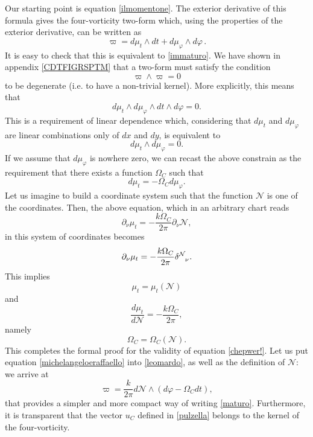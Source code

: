 \documentclass[usenatbib%
]{mnras}
\begin{document}
Our starting point is equation  \eqref{ilmomentone}. The exterior derivative of this formula gives the four-vorticity two-form which, using the properties of the exterior derivative, can be written as
\begin{equation}\label{leomardo}
\varpi = d\mu_t \wedge dt + d\mu_\varphi \wedge d\varphi \, .
\end{equation}
It is easy to check that this is equivalent to \eqref{immaturo}. We have shown in appendix \ref{CDTFIGRSPTM} that a two-form  must satisfy the condition
\begin{equation}
\varpi \wedge \varpi =0
\end{equation} 
to be degenerate (i.e. to have a non-trivial kernel).
More explicitly, this means that
\begin{equation}
d\mu_t \wedge d\mu_\varphi \wedge dt \wedge d\varphi =0.
\end{equation}
This is a requirement of linear dependence which, considering that $d\mu_t$ and $d\mu_\varphi$ are linear combinations only of $dx$ and $dy$, is equivalent to
\begin{equation}
d\mu_t \wedge d\mu_\varphi =0.
\end{equation}
If we assume that $d\mu_\varphi$ is nowhere zero, we can recast the above constrain as the requirement that there exists a function $\Omega_C$ such that
\begin{equation}\label{michelangeloeraffaello}
d\mu_t = -\Omega_C d\mu_\varphi .
\end{equation}
Let us imagine to build a coordinate system such that the function $\mathcal{N}$ is one of the coordinates. Then, the above equation, which in an arbitrary chart reads
\begin{equation}
\partial_\nu \mu_t = -\dfrac{k\Omega_C}{2\pi} \partial_\nu \mathcal{N},
\end{equation}
in this system of coordinates becomes
\begin{equation}
\partial_\nu \mu_t =  -\dfrac{k\Omega_C}{2\pi} \delta\indices{^{\mathcal{N}} _\nu}.
\end{equation}
This implies
\begin{equation}
\mu_t = \mu_t (\mathcal{N})
\end{equation}
and 
\begin{equation}
\dfrac{d\mu_t}{d\mathcal{N}} = -\dfrac{k\Omega_C}{2\pi} ,
\end{equation}
namely
\begin{equation}
\Omega_C = \Omega_C (\mathcal{N}).
\end{equation}
This completes the formal proof for the validity of equation \eqref{chepwer!}. Let us put equation \eqref{michelangeloeraffaello} into \eqref{leomardo}, as well as the definition of $\mathcal{N}$:  we arrive at 
\begin{equation}
\varpi = \dfrac{k}{2\pi} d\mathcal{N} \wedge (d\varphi - \Omega_C dt), 
\end{equation}
that provides  a simpler and more compact way of writing \eqref{maturo}. Furthermore, it is  transparent that the vector $u_C$ defined in \eqref{pulzella} belongs to the kernel of the four-vorticity.
\end{document}
